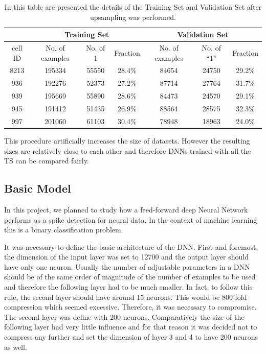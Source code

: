 \documentclass{article}
\begin{document}
\begin{table}[htbp]
\begin{center}
\begin{tabular}{c|ccc|ccc}

\multicolumn{1}{l|}{} & \multicolumn{ 3}{c|}{Training Set} & \multicolumn{ 3}{c}{Validation Set} \\ \hline
cell ID & No. of examples & No. of 1 & Fraction & No. of examples & No. of “1” & Fraction  \\ \hline
8213 & 195334 & 55550 & 28.4\% & 84654 & 24750 & 29.2\% \\ 
936 & 192276 & 52373 & 27.2\% & 87714 & 27764 & 31.7\% \\ 
939 & 195669 & 55890 & 28.6\% & 84473 & 24570 & 29.1\% \\ 
945 & 191412 & 51435 & 26.9\% & 88564 & 28575 & 32.3\% \\ 
997 & 201060 & 61103 & 30.4\% & 78948 & 18963 & 24.0\% \\ 
\end{tabular}
\end{center}
\caption{In this table are presented the details of the Training Set and Validation Set after upsampling was performed. }
\label{table:summary-afterUS}
\end{table}

This procedure artificially increases the size of datasets. However the resulting sizes are relatively close to each other and therefore DNNs trained with all the TS can be compared fairly.

\subsection{Basic Model}
In this project, we planned to study how a  feed-forward deep Neural Network performs as a spike detection for neural data. In the context of machine learning this is a binary classification problem.

It was necessary to define the basic architecture of the DNN. First and foremost, the dimension of the input layer was set to 12700 and the output layer should have only one neuron.
Usually the number of adjustable parameters in a DNN should be of the same order of magnitude of the number of examples to be used and therefore the following layer had to be much smaller. In fact, to follow this rule, the second layer should have around 15 neurons. This would be 800-fold compression which seemed excessive. Therefore, it was necessary to compromise. The second layer was define with 200 neurons. Comparatively the size of the following layer had very little influence and for that reason it was decided not to compress any further and set the dimension of layer 3 and 4 to have 200 neurons as well. 
\end{document}
